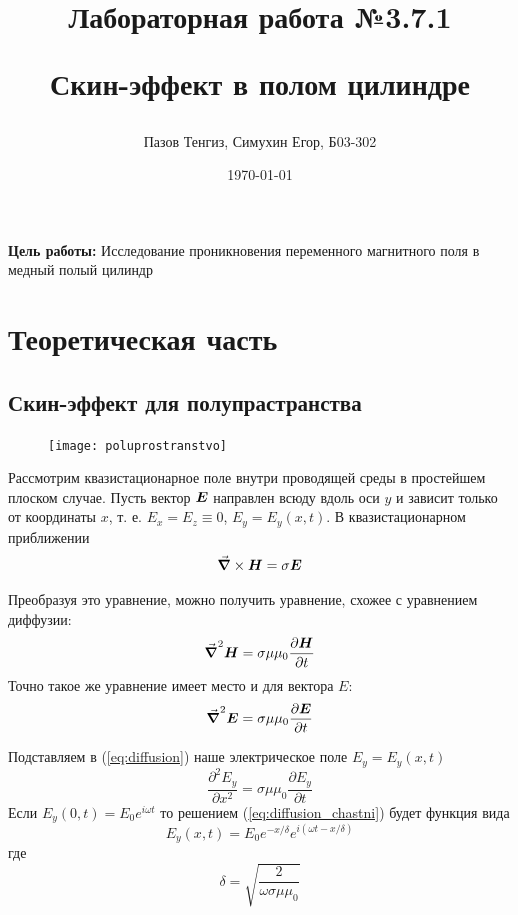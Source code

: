 \documentclass[a4paper, 12pt]{article}
\title{\begin{center}Лабораторная работа №3.7.1\end{center}
	Скин-эффект в полом цилиндре}
\author{Пазов Тенгиз, Симухин Егор, Б03-302}
\date{\today}
\begin{document}
	\maketitle
	\textbf{Цель работы:} Исследование проникновения переменного магнитного поля в медный полый цилиндр
	
	\section*{Теоретическая часть}
	\subsection*{Скин-эффект для полупрастранства}
	\vspace{1cm}
	\begin{figure}
		\begin{center}
			\texttt{[image: poluprostranstvo]}
		\end{center}
	\end{figure}
	
	Рассмотрим квазистационарное поле внутри проводящей среды в простейшем плоском случае.
	Пусть вектор $\vb*{E}$ направлен всюду вдоль оси $y$ и зависит только от координаты $x$, т. е. ${E_x} = {E_z} \equiv 0$, $E_y=E_y(x,t)$.
	В квазистационарном приближении 
	\begin{equation*}
		\grad \times \vb*{H} = \sigma \vb*{E}
	\end{equation*}
	
	Преобразуя это уравнение, можно получить уравнение, схожее с уравнением диффузии:
	\begin{equation}
		\grad^2\vb*{H}=\sigma\mu\mu_0 \frac{\partial \vb*{H}}{\partial t}\label{eq:laplacian_H}
	\end{equation}
	Точно такое же уравнение имеет место и для вектора $E:$
	\begin{equation}
		\grad^2\vb*{E}=\sigma\mu\mu_0 \frac{\partial \vb*{E}}{\partial t}\label{eq:diffusion}
	\end{equation}
	
	Подставляем в (\ref{eq:diffusion}) наше электрическое поле $E_y=E_y(x,t)$
	\begin{equation}
		\frac{\partial^2 E_y}{\partial x^2} = \sigma\mu\mu_0\frac{\partial E_y}{\partial t}
		\label{eq:diffusion_chastni}
	\end{equation}
	Если $E_y(0,t)=E_0 e^{i\omega t}$ то решением (\ref{eq:diffusion_chastni}) будет функция вида
	\begin{equation}
		E_y(x,t)=E_0 e^{-x/\delta} e^{i(\omega t - x/\delta)}
		\label{eq:skin_effect_poluprostranstvo}
	\end{equation}
	где
	\begin{equation}
		\delta = \sqrt{\frac{2}{\omega\sigma\mu\mu_0}}
		\label{eq:delta}
	\end{equation}
	
\end{document}
